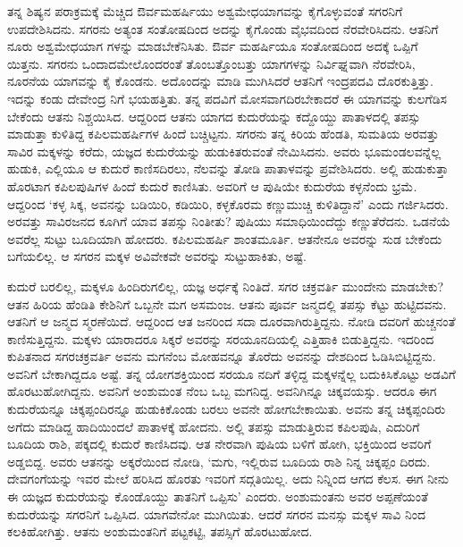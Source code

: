 ತನ್ನ ಶಿಷ್ಯನ ಪರಾಕ್ರಮಕ್ಕೆ ಮೆಚ್ಚಿದ ಔರ್ವಮಹರ್ಷಿಯು ಅಶ್ವಮೇಧಯಾಗವನ್ನು ಕೈಗೊಳ್ಳುವಂತೆ ಸಗರನಿಗೆ ಉಪದೇಶಿಸಿದನು. ಸಗರನು ಅತ್ಯಂತ ಸಂತೋಷದಿಂದ ಅದನ್ನು ಕೈಗೊಂಡು ವೈಭವದಿಂದ ನೆರವೇರಿಸಿದನು. ಆತನಿಗೆ ನೂರು ಅಶ್ವಮೇಧಯಾಗ ಗಳನ್ನು ಮಾಡಬೇಕೆನಿಸಿತು. ಔರ್ವ ಮಹರ್ಷಿಯೂ ಸಂತೋಷದಿಂದ ಅದಕ್ಕೆ ಒಪ್ಪಿಗೆ ಯಿತ್ತನು. ಸಗರನು ಒಂದಾದಮೇಲೊಂದರಂತೆ ತೊಂಬತ್ತೊಂಬತ್ತು ಯಾಗಗಳನ್ನು ನಿರ್ವಿಘ್ನವಾಗಿ ನೆರವೇರಿಸಿ, ನೂರನೆಯ ಯಾಗವನ್ನು ಕೈ ಕೊಂಡನು. ಅದೊಂದನ್ನು ಮಾಡಿ ಮುಗಿಸಿದರೆ ಆತನಿಗೆ ಇಂದ್ರಪದವಿ ದೊರಕುತ್ತಿತ್ತು. ಇದನ್ನು ಕಂಡು ದೇವೇಂದ್ರ ನಿಗೆ ಭಯಹತ್ತಿತು. ತನ್ನ ಪದವಿಗೆ ಮೋಸವಾಗದಿರಬೇಕಾದರೆ ಈ ಯಾಗವನ್ನು ಕುಲಗೆಡಿಸ ಬೇಕೆಂದು ಆತನು ನಿಶ್ಚಯಿಸಿದ. ಆದ್ದರಿಂದ ಆತನು ಯಾಗದ ಕುದುರೆಯನ್ನು ಕದ್ದೊಯ್ದು ಪಾತಾಳದಲ್ಲಿ ತಪಸ್ಸು ಮಾಡುತ್ತಾ ಕುಳಿತಿದ್ದ ಕಪಿಲಮಹರ್ಷಿಗಳ ಹಿಂದೆ ಬಚ್ಚಿಟ್ಟನು. ಸಗರನು ತನ್ನ ಕಿರಿಯ ಹೆಂಡತಿ, ಸುಮತಿಯ ಅರವತ್ತು ಸಾವಿರ ಮಕ್ಕಳನ್ನು ಕರೆದು, ಯಜ್ಞದ ಕುದುರೆಯನ್ನು ಹುಡುಕಿತರುವಂತೆ ನೇಮಿಸಿದನು. ಅವರು ಭೂಮಂಡಲವನ್ನೆಲ್ಲ ಹುಡುಕಿ, ಎಲ್ಲಿಯೂ ಆ ಕುದುರೆ ಕಾಣಿಸದಿರಲು, ನೆಲವನ್ನು ತೋಡಿ ಪಾತಾಳವನ್ನು ಪ್ರವೇಶಿಸಿದರು. ಅಲ್ಲಿ ಹುಡುಕುತ್ತಾ ಹೊರಟಾಗ ಕಪಿಲಪುಷಿಗಳ ಹಿಂದೆ ಕುದುರೆ ಕಾಣಿಸಿತು. ಅವರಿಗೆ ಆ ಪುಷಿಯೇ ಕುದುರೆಯ ಕಳ್ಳನೆಂದು ಭ್ರಮೆ. ಆದ್ದರಿಂದ ‘ಕಳ್ಳ ಸಿಕ್ಕ, ಅವನನ್ನು ಬಡಿಯಿರಿ, ಕಡಿಯಿರಿ, ಕಳ್ಳಕೊರಮ ಕಣ್ಣುಮುಚ್ಚಿ ಕುಳಿತಿದ್ದಾನೆ’ ಎಂದು ಗರ್ಜಿಸಿದರು. ಅರವತ್ತು ಸಾವಿರಜನದ ಕೂಗಿಗೆ ಯಾವ ತಪಸ್ಸು ನಿಂತೀತು? ಪುಷಿಯು ಸಮಾಧಿಯಿಂದೆದ್ದು ಕಣ್ಣುತೆರೆದನು. ಒಡನೆಯೆ ಅವರೆಲ್ಲ ಸುಟ್ಟು ಬೂದಿಯಾಗಿ ಹೋದರು. ಕಪಿಲಮಹರ್ಷಿ ಶಾಂತಮೂರ್ತಿ. ಆತನೇನೂ ಅವರನ್ನು ಸುಡ ಬೇಕೆಂದು ಬಗೆಯಲಿಲ್ಲ. ಆ ಸಗರನ ಮಕ್ಕಳ ಅವಿವೇಕವೇ ಅವರನ್ನು ಸುಟ್ಟುಹಾಕಿತು, ಅಷ್ಟೆ.

ಕುದುರೆ ಬರಲಿಲ್ಲ, ಮಕ್ಕಳೂ ಹಿಂದಿರುಗಲಿಲ್ಲ, ಯಜ್ಞ ಅರ್ಧಕ್ಕೆ ನಿಂತಿದೆ. ಸಗರ ಚಕ್ರವರ್ತಿ ಮುಂದೇನು ಮಾಡಬೇಕು? ಆತನ ಹಿರಿಯ ಹೆಂಡಿತಿ ಕೇಶಿನಿಗೆ ಒಬ್ಬನೇ ಮಗ ಅಸಮಂಜ. ಆತನು ಪೂರ್ವ ಜನ್ಮದಲ್ಲಿ ತಪಸ್ಸು ಕೆಟ್ಟು ಹುಟ್ಟಿದವನು. ಆತನಿಗೆ ಆ ಜನ್ಮದ ಸ್ಮರಣೆಯಿದೆ. ಆದ್ದರಿಂದ ಆತ ಜನರಿಂದ ಸದಾ ದೂರವಾಗಿರುತ್ತಿದ್ದನು. ನೋಡಿ ದವರಿಗೆ ಹುಚ್ಚನಂತೆ ಕಾಣಿಸುತ್ತಿದ್ದನು. ಮಕ್ಕಳು ಯಾರಾದರೂ ಸಿಕ್ಕರೆ ಅವರನ್ನು ಸರಯೂನದಿಯಲ್ಲಿ ಎತ್ತಿಹಾಕಿ ಬಿಡುತ್ತಿದ್ದನು. ಇದರಿಂದ ಕುಪಿತನಾದ ಸಗರಚಕ್ರವರ್ತಿ ಅವನು ಮಗನೆಂಬ ಮೋಹವನ್ನೂ ತೊರೆದು ಅವನನ್ನು ದೇಶದಿಂದ ಓಡಿಸಿಬಿಟ್ಟಿದ್ದನು. ಅವನಿಗೆ ಬೇಕಾಗಿದ್ದದೂ ಅಷ್ಟೆ. ತನ್ನ ಯೋಗಶಕ್ತಿಯಿಂದ ಸರಯೂ ನದಿಗೆ ತಳ್ಳಿದ್ದ ಮಕ್ಕಳನ್ನೆಲ್ಲ ಬದುಕಿಸಿಕೊಟ್ಟು ಅಡವಿಗೆ ಹೊರಟುಹೋಗಿದ್ದನು. ಅವನಿಗೆ ಅಂಶುಮಂತ ನೆಂಬ ಒಬ್ಬ ಮಗನಿದ್ದ. ಅವನಿಗಿನ್ನೂ ಚಿಕ್ಕವಯಸ್ಸು. ಆದರೂ ಈಗ ಕುದುರೆಯನ್ನೂ ಚಿಕ್ಕಪ್ಪಂದಿರನ್ನೂ ಹುಡುಕಿಕೊಂಡು ಬರಲು ಅವನೇ ಹೋಗಬೇಕಾಯಿತು. ಅವನು ತನ್ನ ಚಿಕ್ಕಪ್ಪಂದಿರು ಅಗೆದು ಮಾಡಿದ್ದ ಹಾದಿಯಿಂದಲೆ ಪಾತಾಳಕ್ಕೆ ಹೋದನು. ಅಲ್ಲಿ ತಪಸ್ಸು ಮಾಡುತ್ತಿರುವ ಕಪಿಲಪುಷಿ, ಎದುರಿಗೆ ಬೂದಿಯ ರಾಶಿ, ಪಕ್ಕದಲ್ಲಿ ಕುದುರೆ ಕಾಣಿಸಿದವು. ಆತ ನೇರವಾಗಿ ಪುಷಿಯ ಬಳಿಗೆ ಹೋಗಿ, ಭಕ್ತಿಯಿಂದ ಅವರಿಗೆ ಅಡ್ಡಬಿದ್ದ. ಅವರು ಆತನನ್ನು ಅಕ್ಕರೆಯಿಂದ ನೋಡಿ, ‘ಮಗು, ಇಲ್ಲಿರುವ ಬೂದಿಯ ರಾಶಿ ನಿನ್ನ ಚಿಕ್ಕಪ್ಪಂ ದಿರದು. ದೇವಗಂಗೆಯನ್ನು ಇವರ ಮೇಲೆ ಹರಿಸಿದ ಹೊರತು ಇವರಿಗೆ ಸದ್ಗತಿಯಿಲ್ಲ. ಅದು ನಿನ್ನಿಂದ ಆಗದ ಕೆಲಸ. ಈಗ ನೀನು ಈ ಯಜ್ಞದ ಕುದುರೆಯನ್ನು ಕೊಂಡೊಯ್ದು ತಾತನಿಗೆ ಒಪ್ಪಿಸು’ ಎಂದರು. ಅಂಶುಮಂತನು ಅವರ ಅಪ್ಪಣೆಯಂತೆ ಕುದುರೆಯನ್ನು ಸಗರನಿಗೆ ಒಪ್ಪಿಸಿದ. ಯಾಗವೇನೋ ಮುಗಿಯಿತು. ಆದರೆ ಸಗರನ ಮನಸ್ಸು ಮಕ್ಕಳ ಸಾವಿ ನಿಂದ ಕಲಕಿಹೋಗಿತ್ತು. ಆತನು ಅಂಶುಮಂತನಿಗೆ ಪಟ್ಟಕಟ್ಟಿ, ತಪಸ್ಸಿಗೆ ಹೊರಟುಹೋದ.



